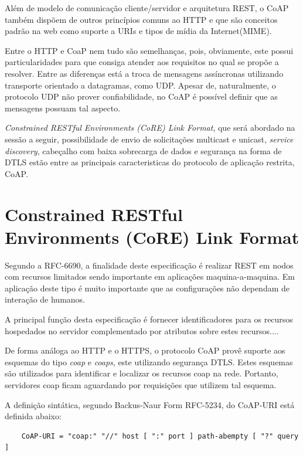 Além de modelo de comunicação cliente/servidor e arquitetura REST, o CoAP também dispõem de outros princípios comuns ao HTTP e que são conceitos padrão na web
como suporte a URIs\cite{rfc3986} e tipos de mídia da Internet(MIME)\cite{rfc2046}.

Entre o HTTP e CoaP nem tudo são semelhanças, pois, obviamente, este possui particularidades para que consiga atender aos requisitos no qual se propõe a resolver.
Entre as diferenças está a troca de mensagens assíncronas utilizando transporte orientado a datagramas, como UDP.
Apesar de, naturalmente, o protocolo UDP não prover confiabilidade, no CoAP é possível definir que as mensagens possuam tal aspecto.

\textit{Constrained RESTful Environments (CoRE) Link Format}, que será abordado na sessão a seguir, possibilidade de envio de solicitações multicast e unicast, \textit{service discovery}, cabeçalho com baixa sobrecarga de dados e segurança na forma de DTLS\cite{rfc6347}
estão entre as principais caracteristicas do protocolo de aplicação restrita, CoAP.



\section{Constrained RESTful Environments (CoRE) Link Format}

Segundo a RFC-6690, a finalidade deste especificação é realizar REST em nodos com recursos limitados sendo importante em aplicações maquina-a-maquina\cite{rfc6690}.
Em aplicação deste tipo é muito importante que as configurações não dependam de interação de humanos.

A principal função desta especificação é fornecer identificadores para os recursos hospedados no servidor complementado por atributos sobre estes recursos....




De forma análoga ao HTTP  e o HTTPS, o protocolo CoAP provê suporte aos esquemas do tipo \textit{coap} e \textit{coaps}, este utilizando segurança DTLS.
Estes esquemas são utilizados para identificar e localizar os recursos coap na rede.
Portanto, servidores coap ficam aguardando por requisições que utilizem tal esquema.

A definição sintática, segundo Backus-Naur Form RFC-5234\cite{rfc5234},  do  CoAP-URI está definida abaixo:

\begin{verbatim}
    CoAP-URI = "coap:" "//" host [ ":" port ] path-abempty [ "?" query ]
\end{verbatim}





